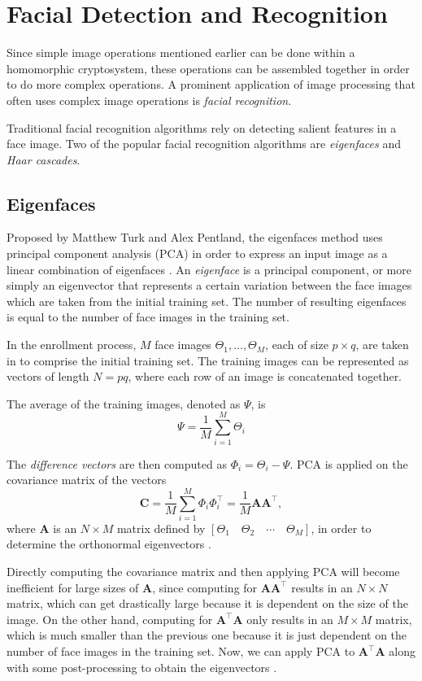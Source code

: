 \section{Facial Detection and Recognition}

Since simple image operations mentioned earlier can be done within a homomorphic cryptosystem, these operations can be assembled together in order to do more complex operations. A prominent application of image processing that often uses complex image operations is \textit{facial recognition}.

Traditional facial recognition algorithms rely on detecting salient features in a face image. Two of the popular facial recognition algorithms are \textit{eigenfaces} and \textit{Haar cascades}.

\subsection{Eigenfaces}

Proposed by Matthew Turk and Alex Pentland, the eigenfaces method uses principal component analysis (PCA) in order to express an input image as a linear combination of eigenfaces \cite{turk_eigenfaces_1991}. An \textit{eigenface} is a principal component, or more simply an eigenvector that represents a certain variation between the face images which are taken from the initial training set. The number of resulting eigenfaces is equal to the number of face images in the training set.

In the enrollment process, $M$ face images $\Theta_1, \ldots, \Theta_M$, each of size $p \times q$, are taken in to comprise the initial training set. The training images can be represented as vectors of length $N = pq$, where each row of an image is concatenated together.

The average of the training images, denoted as $\Psi$, is 
\[ \Psi = \frac{1}{M} \sum_{i=1}^{M} \Theta_i \]

The \textit{difference vectors} are then computed as $\Phi_i = \Theta_i - \Psi$. PCA is applied on the covariance matrix of the vectors
\[ \mathbf{C} = \frac{1}{M} \sum_{i=1}^M \Phi_i \Phi_i^\top = \frac{1}{M} \mathbf{A}\mathbf{A}^\top,\]
where $\mathbf{A}$ is an $N \times M$ matrix defined by $\left[\Theta_1 \quad \Theta_2 \quad \cdots \quad \Theta_M\right]$, in order to determine the orthonormal eigenvectors \cite{hutchison_privacy-preserving_2009}.

Directly computing the covariance matrix and then applying PCA will become inefficient for large sizes of $\mathbf{A}$, since computing for $\mathbf{A}\mathbf{A}^\top$ results in an $N \times N$ matrix, which can get drastically large because it is dependent on the size of the image. On the other hand, computing for $\mathbf{A}^\top\mathbf{A}$ only results in an $M \times M$ matrix, which is much smaller than the previous one because it is just dependent on the number of face images in the training set. Now, we can apply PCA to $\mathbf{A}^\top\mathbf{A}$ along with some post-processing to obtain the eigenvectors \cite{hutchison_privacy-preserving_2009}. 

